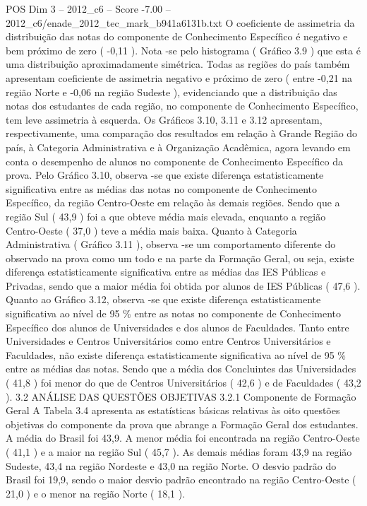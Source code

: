 \begin{textsample}{POS Dim 3 – 2012\_c6 – Score -7.00 – 2012\_c6/enade\_2012\_tec\_mark\_b941a6131b.txt}
O coeficiente de assimetria da distribuição das notas do componente de Conhecimento Específico é negativo e bem próximo de zero ( -0,11 ).
Nota -se pelo histograma ( Gráfico 3.9 ) que esta é uma distribuição aproximadamente simétrica.
Todas as regiões do país também apresentam coeficiente de assimetria negativo e próximo de zero ( entre -0,21 na região Norte e -0,06 na região Sudeste ), evidenciando que a distribuição das notas dos estudantes de cada região, no componente de Conhecimento Específico, tem leve assimetria à esquerda.
Os Gráficos 3.10, 3.11 e 3.12 apresentam, respectivamente, uma comparação dos resultados em relação à Grande Região do país, à Categoria Administrativa e à Organização Acadêmica, agora levando em conta o desempenho de alunos no componente de Conhecimento Específico da prova.
Pelo Gráfico 3.10, observa -se que existe diferença estatisticamente significativa entre as médias das notas no componente de Conhecimento Específico, da região Centro-Oeste em relação às demais regiões.
Sendo que a região Sul ( 43,9 ) foi a que obteve média mais elevada, enquanto a região Centro-Oeste ( 37,0 ) teve a média mais baixa.
Quanto à Categoria Administrativa ( Gráfico 3.11 ), observa -se um comportamento diferente do observado na prova como um todo e na parte da Formação Geral, ou seja, existe diferença estatisticamente significativa entre as médias das IES Públicas e Privadas, sendo que a maior média foi obtida por alunos de IES Públicas ( 47,6 ).
Quanto ao Gráfico 3.12, observa -se que existe diferença estatisticamente significativa ao nível de 95 \% entre as notas no componente de Conhecimento Específico dos alunos de Universidades e dos alunos de Faculdades.
Tanto entre Universidades e Centros Universitários como entre Centros Universitários e Faculdades, não existe diferença estatisticamente significativa ao nível de 95 \% entre as médias das notas.
Sendo que a média dos Concluintes das Universidades ( 41,8 ) foi menor do que de Centros Universitários ( 42,6 ) e de Faculdades ( 43,2 ). 3.2 ANÁLISE DAS QUESTÕES OBJETIVAS 3.2.1 Componente de Formação Geral A Tabela 3.4 apresenta as estatísticas básicas relativas às oito questões objetivas do componente da prova que abrange a Formação Geral dos estudantes.
A média do Brasil foi 43,9.
A menor média foi encontrada na região Centro-Oeste ( 41,1 ) e a maior na região Sul ( 45,7 ).
As demais médias foram 43,9 na região Sudeste, 43,4 na região Nordeste e 43,0 na região Norte.
O desvio padrão do Brasil foi 19,9, sendo o maior desvio padrão encontrado na região Centro-Oeste ( 21,0 ) e o menor na região Norte ( 18,1 ).

\end{textsample}
